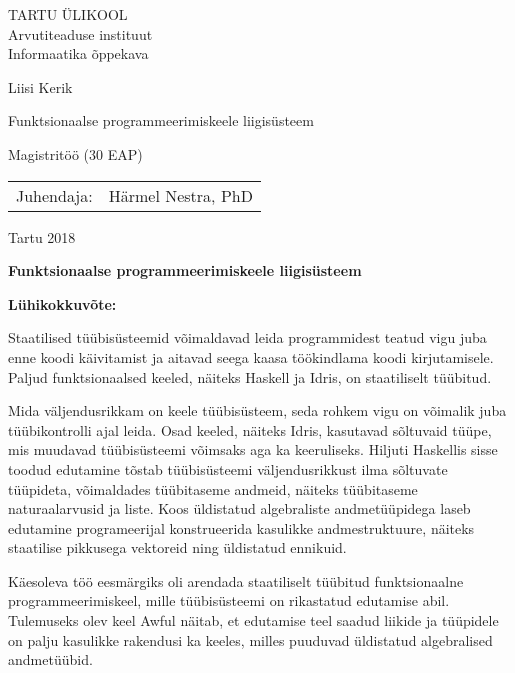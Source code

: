 \documentclass[12pt]{article}
\def\pealkiri{Funktsionaalse programmeerimiskeele liigisüsteem}
\begin{document}
  \thispagestyle{empty}
  \begin{center}
    \large
      TARTU ÜLIKOOL\\
      Arvutiteaduse instituut\\
      Informaatika õppekava

    \vspace{25mm}

    \Large
      Liisi Kerik

    \vspace{4mm}

    \huge
      \pealkiri

    \vspace{20mm}

    \Large
      Magistritöö (30 EAP)
  \end{center}

  \vspace{2mm}

  \begin{flushright}
    \begin{tabular}{rl} 
      Juhendaja: & Härmel Nestra, PhD
    \end{tabular}
  \end{flushright}
  \vfill
  \centerline{Tartu 2018}
  \newpage
  \noindent
  \textbf{\large\pealkiri}

  \vspace*{1ex}

  \noindent
  \textbf{Lühikokkuvõte:} 

  \noindent
  Staatilised tüübisüsteemid võimaldavad leida programmidest teatud vigu juba enne koodi käivitamist ja aitavad seega kaasa töökindlama koodi kirjutamisele. Paljud funktsionaalsed keeled, näiteks Haskell ja Idris, on staatiliselt tüübitud.

  Mida väljendusrikkam on keele tüübisüsteem, seda rohkem vigu on võimalik juba tüübikontrolli ajal leida. Osad keeled, näiteks Idris, kasutavad sõltuvaid tüüpe, mis muudavad tüübisüsteemi võimsaks aga ka keeruliseks. Hiljuti Haskellis sisse toodud edutamine tõstab tüübisüsteemi väljendusrikkust ilma sõltuvate tüüpideta, võimaldades tüübitaseme andmeid, näiteks tüübitaseme naturaalarvusid ja liste. Koos üldistatud algebraliste andmetüüpidega laseb edutamine programeerijal konstrueerida kasulikke andmestruktuure, näiteks staatilise pikkusega vektoreid ning üldistatud ennikuid.

  Käesoleva töö eesmärgiks oli arendada staatiliselt tüübitud funktsionaalne programmeerimiskeel, mille tüübisüsteemi on rikastatud edutamise abil. Tulemuseks olev keel Awful näitab, et edutamise teel saadud liikide ja tüüpidele on palju kasulikke rakendusi ka keeles, milles puuduvad üldistatud algebralised andmetüübid.
\end{document}
